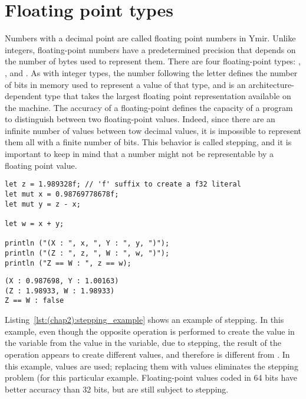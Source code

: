 \section{Floating point types}


Numbers with a decimal point are called floating point numbers in Ymir. Unlike
integers, floating-point numbers have a predetermined precision that depends on
the number of bytes used to represent them. There are four floating-point types:
, ,  and . As with integer types,
the number following the letter  defines the number of bits in memory
used to represent a value of that type, and  is an
architecture-dependent type that takes the largest floating point representation
available on the machine. The accuracy of a floating-point defines the capacity
of a program to distinguish between two floating-point values. Indeed, since
there are an infinite number of values between tow decimal values, it is
impossible to represent them all with a finite number of bits. This behavior is
called stepping, and it is important to keep in mind that a number might not be
representable by a floating point value.

\begin{lstlisting}[style=coloredVerbatim, label=lst:(chap2):stepping_example, caption=Example of floating point stepping]
let z = 1.989328f; // 'f' suffix to create a f32 literal
let mut x = 0.98769778678f;
let mut y = z - x;

let w = x + y;

println ("(X : ", x, ", Y : ", y, ")");
println ("(Z : ", z, ", W : ", w, ")");
println ("Z == W : ", z == w);
\end{lstlisting}
\vspace{-10pt}%
\begin{lstlisting}[style=bashVerb]
(X : 0.987698, Y : 1.00163)
(Z : 1.98933, W : 1.98933)
Z == W : false
\end{lstlisting}

Listing~\ref{lst:(chap2):stepping_example} shows an example of stepping. In this
example, even though the opposite operation is performed to create the value in
the  variable from the value in the  variable, due to
stepping, the result of the operation appears to create different values, and
therefore  is different from . In this example, 
values are used; replacing them with  values eliminates the stepping
problem (for this particular example. Floating-point values coded in 64 bits
have better accuracy than 32 bits, but are still subject to stepping.

